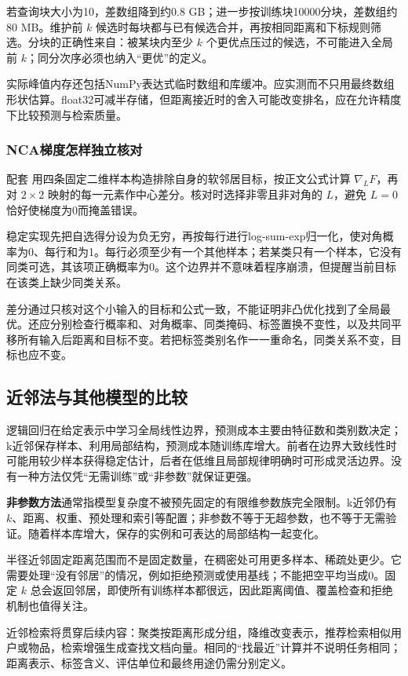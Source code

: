 \documentclass[UTF8,fontset=none,zihao=-4,a4paper]{ctexart}
\newcommand{\term}[1]{\textbf{#1}}
\newcommand{\code}[1]{\texttt{\detokenize{#1}}}
\numberwithin{equation}{section}
\numberwithin{figure}{section}
\begin{document}
若查询块大小为10，差数组降到约0.8 GB；进一步按训练块10000分块，差数组约80 MB。维护前 $k$ 候选时每块都与已有候选合并，再按相同距离和下标规则筛选。分块的正确性来自：被某块内至少 $k$ 个更优点压过的候选，不可能进入全局前 $k$；同分次序必须也纳入“更优”的定义。

实际峰值内存还包括NumPy表达式临时数组和库缓冲。应实测而不只用最终数组形状估算。float32可减半存储，但距离接近时的舍入可能改变排名，应在允许精度下比较预测与检索质量。

\subsubsection{NCA梯度怎样独立核对}
配套 \code{ch15_solutions.py} 用四条固定二维样本构造排除自身的软邻居目标，按正文公式计算 $\nabla_LF$，再对 $2\times2$ 映射的每一元素作中心差分。核对时选择非零且非对角的 $L$，避免 $L=0$ 恰好使梯度为0而掩盖错误。

稳定实现先把自选得分设为负无穷，再按每行进行log-sum-exp归一化，使对角概率为0、每行和为1。每行必须至少有一个其他样本；若某类只有一个样本，它没有同类可选，其该项正确概率为0。这个边界并不意味着程序崩溃，但提醒当前目标在该类上缺少同类关系。

差分通过只核对这个小输入的目标和公式一致，不能证明非凸优化找到了全局最优。还应分别检查行概率和、对角概率、同类掩码、标签置换不变性，以及共同平移所有输入后距离和目标不变。若把标签类别名作一一重命名，同类关系不变，目标也应不变。

\subsection{近邻法与其他模型的比较}
逻辑回归在给定表示中学习全局线性边界，预测成本主要由特征数和类别数决定；k近邻保存样本、利用局部结构，预测成本随训练库增大。前者在边界大致线性时可能用较少样本获得稳定估计，后者在低维且局部规律明确时可形成灵活边界。没有一种方法仅凭“无需训练”或“非参数”就保证更强。

\term{非参数方法}通常指模型复杂度不被预先固定的有限维参数族完全限制。k近邻仍有 $k$、距离、权重、预处理和索引等配置；非参数不等于无超参数，也不等于无需验证。随着样本库增大，保存的实例和可表达的局部结构一起变化。

半径近邻固定距离范围而不是固定数量，在稠密处可用更多样本、稀疏处更少。它需要处理“没有邻居”的情况，例如拒绝预测或使用基线；不能把空平均当成0。固定 $k$ 总会返回邻居，即使所有训练样本都很远，因此距离阈值、覆盖检查和拒绝机制也值得关注。

近邻检索将贯穿后续内容：聚类按距离形成分组，降维改变表示，推荐检索相似用户或物品，检索增强生成查找文档向量。相同的“找最近”计算并不说明任务相同；距离表示、标签含义、评估单位和最终用途仍需分别定义。
\end{document}
